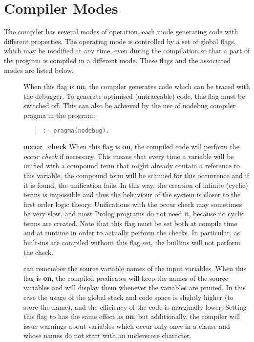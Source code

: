 \section{Compiler Modes}
The compiler has several modes of operation, each mode
generating code with different properties.
The operating mode is controlled by a set of global flags,
which may be modified at any time, even during the compilation
so that a part of the program is compiled in a different mode.
These flags and the associated modes are listed below.

\begin{description}
\item [] 
When this flag is {\bf on}, the compiler generates code which can
be traced with the debugger.
To generate optimised (untraceable) code, this flag must be switched off.
This can also be achieved by the use of nodebug compiler pragma in the
program:

\begin{quote}
\begin{verbatim}
:- pragma(nodebug).
\end{verbatim}
\end{quote}

\item[] {\bf occur_check}
When this flag is {\bf on}, the compiled code will perform
the {\it occur check} if necessary.
This means that every time a variable will be unified
with a compound term that might already contain a reference
to this variable, the compound term will be scanned for this occurrence
and if it is found, the unification fails.
In this way, the creation of infinite (cyclic) terms is impossible
and thus the behaviour of the system is closer
to the first order logic theory.
Unifications with the occur check may sometimes be very slow,
and most Prolog programs do not need it, because
no cyclic terms are created.
Note that this flag must be set both at compile time and at runtime in order
to actually perform the checks. In particular, as {\eclipse} built-ins are
compiled without this flag set, the builtins will not perform the check.

\item [] 
{\eclipse} can remember the source variable names of the input variables.
When this flag is {\bf on}, the compiled predicates
will keep the names of the source variables and will display
them whenever the variables are printed.
In this case the usage of the global stack and code space is slightly higher
(to store the name), and the efficiency of the code is marginally lower.
Setting this flag to  has the same effect as {\bf on},
but additionally, the compiler will issue warnings about variables which occur
only once in a clause and whose names do not start with an underscore character.


\end{description}
